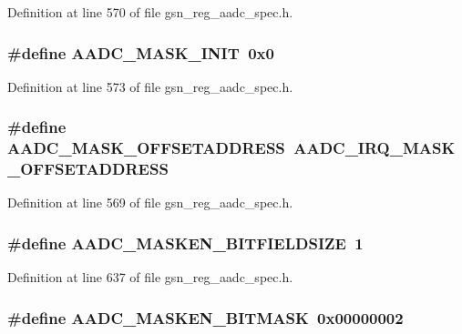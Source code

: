 Definition at line 570 of file gsn\_\-reg\_\-aadc\_\-spec.h.

\hypertarget{a00543_a138be4490852223afcaf6fd554ec344d}{
\subsubsection[{AADC\_\-MASK\_\-INIT}]{\setlength{\rightskip}{0pt plus 5cm}\#define AADC\_\-MASK\_\-INIT~0x0}}
\label{a00543_a138be4490852223afcaf6fd554ec344d}


Definition at line 573 of file gsn\_\-reg\_\-aadc\_\-spec.h.

\hypertarget{a00543_a6ccdf9b9fffbc49f3080b0fed23d5a2e}{
\subsubsection[{AADC\_\-MASK\_\-OFFSETADDRESS}]{\setlength{\rightskip}{0pt plus 5cm}\#define AADC\_\-MASK\_\-OFFSETADDRESS~AADC\_\-IRQ\_\-MASK\_\-OFFSETADDRESS}}
\label{a00543_a6ccdf9b9fffbc49f3080b0fed23d5a2e}


Definition at line 569 of file gsn\_\-reg\_\-aadc\_\-spec.h.

\hypertarget{a00543_a6a7072a1d2919bf057371e05ec3b37b5}{
\subsubsection[{AADC\_\-MASKEN\_\-BITFIELDSIZE}]{\setlength{\rightskip}{0pt plus 5cm}\#define AADC\_\-MASKEN\_\-BITFIELDSIZE~1}}
\label{a00543_a6a7072a1d2919bf057371e05ec3b37b5}


Definition at line 637 of file gsn\_\-reg\_\-aadc\_\-spec.h.

\hypertarget{a00543_a345daa53035787407322e73792b30562}{
\subsubsection[{AADC\_\-MASKEN\_\-BITMASK}]{\setlength{\rightskip}{0pt plus 5cm}\#define AADC\_\-MASKEN\_\-BITMASK~0x00000002}}
\label{a00543_a345daa53035787407322e73792b30562}


